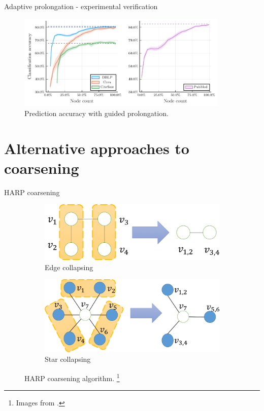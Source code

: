 \documentclass[10pt, aspectratio=169]{beamer}
\begin{document}
\begin{frame}{Adaptive prolongation - experimental verification}
	\begin{figure}
		\centering
		\includegraphics[width=0.9\textwidth]{images/adaptive-coarsening/adaptive-coarsening.pdf}
		\caption{Prediction accuracy with guided prolongation.}
	\end{figure}
\end{frame}

\section{Alternative approaches to coarsening}

\begin{frame}{HARP coarsening}
	\begin{figure}
		\centering
		\begin{subfigure}[t]{0.38\textwidth}
			\centering
			\includegraphics[width=\textwidth]{images/edge_collapsing.png}
			\caption{Edge collapsing}
		\end{subfigure}
		\hspace{2em}
		\begin{subfigure}[t]{0.38\textwidth}
			\centering
			\includegraphics[width=\textwidth]{images/star_collapsing.png}
			\caption{Star collapsing}
		\end{subfigure}
		\caption{HARP coarsening algorithm. \footnote{Images from \cite{chen_harp_2018}.}}
	\end{figure}
\end{frame}
\end{document}
